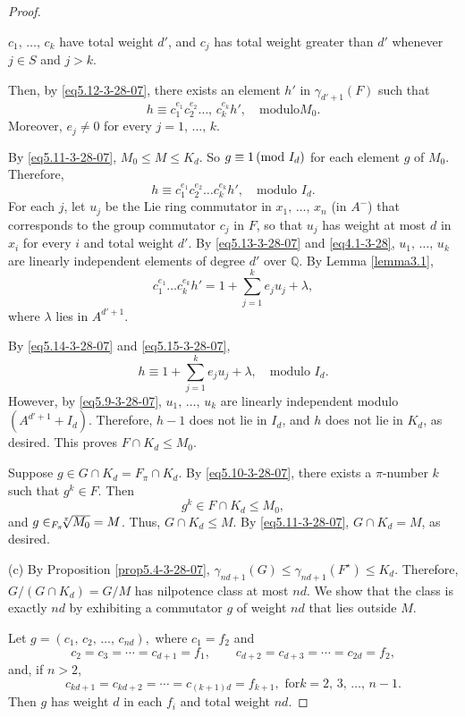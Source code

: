 \documentclass[mathscr]{amsart}
\theoremstyle{theorem}
\theoremstyle{definition}
\numberwithin{equation}{section}
\newcommand{\smod}[1]{\hspace*{-.1cm}\pmod{#1}}
\def \({\left(}
\def \){\right)}
\begin{document}
\begin{proof}
\begin{center}
$c_1,\,\dots,\,c_k$ have total weight $d'$, and $c_j$ has total
weight greater than $d'$ whenever $j\in S$ and $j>k$.
\end{center}
Then, by \eqref{eq5.12-3-28-07}, there exists an element $h'$ in
$\gamma_{d'+1}(F)$ such that
$$
h\equiv c_1^{e_1}c_2^{e_2}\dots,\,c_k^{e_k}h',\quad \text{modulo
}M_0.
$$
Moreover, $e_j\neq 0$ for every $j=1,\,\dots,\,k$.

By \eqref{eq5.11-3-28-07}, $M_0\leq M\leq K_d$.  So $g\equiv
1\smod{I_d}$ for each element $g$ of $M_0$.  Therefore,
\begin{equation}\label{eq5.14-3-28-07}
h\equiv c_1^{e_1}c_2^{e_2}\dots c_k^{e_k}h',\quad\text{modulo }I_d.
\end{equation}
For each $j$, let $u_j$ be the Lie ring commutator in
$x_1,\,\dots,\,x_n$ (in $A^-$) that corresponds to the group
commutator $c_j$ in $F$, so that $u_j$ has weight at most $d$ in
$x_i$ for every $i$ and total weight $d'$.  By
\eqref{eq5.13-3-28-07} and \eqref{eq4.1-3-28}, $u_1,\,\dots,\,u_k$
are linearly independent elements of degree $d'$ over $\mathbb{Q}$.
By Lemma \ref{lemma3.1},
\begin{equation}\label{eq5.15-3-28-07}
c_1^{e_1}\dots c_k^{e_k} h' =1+\sum_{j=1}^ke_ju_j+\lambda,
\end{equation}
where $\lambda$ lies in $A^{d'+1}$.

By \eqref{eq5.14-3-28-07} and \eqref{eq5.15-3-28-07},
$$
h\equiv 1+\sum_{j=1}^ke_ju_j+\lambda,\quad\text{modulo }I_d.
$$
However, by \eqref{eq5.9-3-28-07}, $u_1,\,\dots,\,u_k$ are linearly
independent modulo $\(A^{d'+1}+I_d\)$. Therefore, $h-1$ does not lie
in $I_d$, and $h$ does not lie in $K_d$, as desired.  This proves
$F\cap K_d \leq M_0$.

Suppose $g\in G\cap K_d=F_\pi \cap K_d$.  By \eqref{eq5.10-3-28-07},
there exists a $\pi$-number $k$ such that $g^k\in F$.  Then
$$
g^k\in F\cap K_d\leq M_0,
$$
and $g\in _{F_\pi}\hspace*{-0.2cm}\sqrt[\pi]{M_0}=M$.  Thus, $G\cap
K_d\leq M.$ By \eqref{eq5.11-3-28-07}, $G\cap K_d=M$, as desired.

\item[(c)] By Proposition \ref{prop5.4-3-28-07},
$\gamma_{nd+1}(G)\leq \gamma_{nd+1}\(F^\star\)\leq K_d$.  Therefore,
$G/\(G\cap K_d\)=G/M$ has nilpotence class at most $nd$.  We show
that the class is exactly $nd$ by exhibiting a commutator $g$ of
weight $nd$ that lies outside $M$.

Let $g=\(c_1,\,c_2,\,\dots,\,c_{nd}\),$ where $c_1=f_2$ and
$$
c_2=c_3=\cdots =c_{d+1}=f_1,\qquad
c_{d+2}=c_{d+3}=\cdots=c_{2d}=f_2,
$$
and, if $n>2$,
$$
c_{kd+1}=c_{kd+2}=\cdots=c_{(k+1)d}=f_{k+1},\text{ for
}k=2,\,3,\,\dots,\,n-1.
$$
Then $g$ has weight $d$ in each $f_i$ and total weight  $nd$.


\end{proof}
\end{document}
